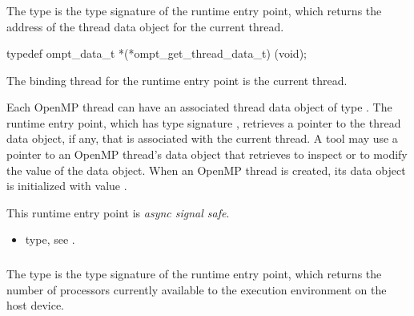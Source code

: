 \subsubsection{}
\label{sec:ompt_get_thread_data_t}
\label{sec:ompt_get_thread_data}

\summary
The  type is the type signature of the 
 runtime entry point, which returns the
address of the thread data object for the current thread.

\format
\begin{ccppspecific}
\begin{omptInquiry}
typedef ompt_data_t *(*ompt_get_thread_data_t) (void);
\end{omptInquiry}
\end{ccppspecific}

\binding
The binding thread for the  runtime entry 
point is the current thread.

\descr
Each OpenMP thread can have an associated thread data object of type 
. The  runtime entry point, 
which has type signature , retrieves a pointer 
to the thread data object, if any, that is associated with the current thread. 
A tool may use a pointer to an OpenMP thread's data object that 
 retrieves to inspect or to modify the value of 
the data object. When an OpenMP thread is created, its data object is
initialized with value .

This runtime entry point is \emph{async signal safe}.

\crossreferences
\begin{itemize}
\item {} type, see .
\end{itemize}



\subsubsection{}
\label{sec:ompt_get_num_procs_t}

\summary
The  type is the type signature of the 
 runtime entry point, which returns the
number of processors currently available to the execution environment 
on the host device.

